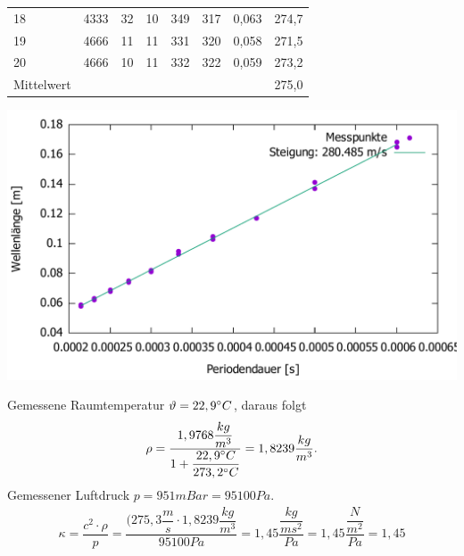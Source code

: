 \documentclass{scrartcl}
\begin{document}
\begin{table}[h!]
\begin{tabular}{l|l|l|l|l|l|l|l}
18      & 4333       & 32                & 10 & 349               & 317 & 0,063 & 274,7 \\
19      & 4666       & 11                & 11 & 331               & 320 & 0,058 & 271,5 \\
20      & 4666       & 10                & 11 & 332               & 322 & 0,059 & 273,2 \\
\hline
Mittelwert & & & & & & & 275,0
\end{tabular}
\includegraphics[width=1\textwidth]{linregV1_C.pdf}
\end{table}
Gemessene Raumtemperatur $\vartheta = 22,9\degree C$, daraus folgt 
\begin{align*}
\rho =  \dfrac{1,9768 \dfrac{kg}{m^3}}{1 + \dfrac{22,9\degree C}{273,2 \degree C}} = 1,8239 \dfrac{kg}{m^3}.
\end{align*}
Gemessener Luftdruck $p = 951 mBar = 95100 Pa$.
\begin{align*}
\kappa = \dfrac{c^2 \cdot \rho}{p} = \dfrac{(275,3 \dfrac{m}{s} \cdot 1,8239 \dfrac{kg}{m^3}}{95100 Pa} = 1,45 \dfrac{\dfrac{kg}{ms^2}}{Pa} = 1,45 \dfrac{\dfrac{N}{m^2}}{Pa} = 1,45
\end{align*}
\end{document}
